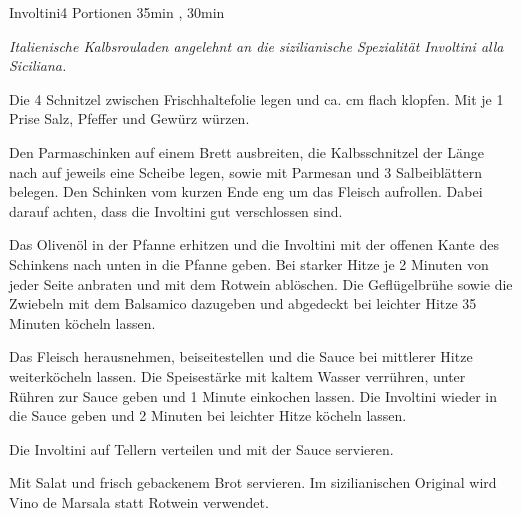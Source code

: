 \documentclass[../recipe-collections/cooking.tex]{subfiles}
\begin{document}
\begin{recipe}{Involtini}{4 Portionen }{35min , 30min }

  \freeform{}\textit{Italienische Kalbsrouladen angelehnt an die sizilianische Spezialität Involtini alla Siciliana.}


  Die 4 Schnitzel zwischen Frischhaltefolie legen und ca.  cm flach klopfen.
  Mit je 1 Prise Salz, Pfeffer und Gewürz würzen.


  Den Parmaschinken auf einem Brett ausbreiten, die Kalbsschnitzel der Länge nach auf jeweils eine Scheibe legen, sowie mit Parmesan und 3 Salbeiblättern belegen.
  Den Schinken vom kurzen Ende eng um das Fleisch aufrollen.
  Dabei darauf achten, dass die Involtini gut verschlossen sind.


  Das Olivenöl in der Pfanne erhitzen und die Involtini mit der offenen Kante des Schinkens nach unten in die Pfanne geben.
  Bei starker Hitze je 2 Minuten von jeder Seite anbraten und mit dem Rotwein ablöschen.
  Die Geflügelbrühe sowie die Zwiebeln mit dem Balsamico dazugeben und abgedeckt bei leichter Hitze 35 Minuten köcheln lassen.


  Das Fleisch herausnehmen, beiseitestellen und die Sauce bei mittlerer Hitze weiterköcheln lassen.
  Die Speisestärke mit kaltem Wasser verrühren, unter Rühren zur Sauce geben und 1 Minute einkochen lassen.
  Die Involtini wieder in die Sauce geben und 2 Minuten bei leichter Hitze köcheln lassen.

  \newstep{}Die Involtini auf Tellern verteilen und mit der Sauce servieren.

  \freeform{}\hrulefill{}

  \freeform{}
  Mit Salat und frisch gebackenem Brot servieren. Im sizilianischen Original wird Vino de Marsala statt Rotwein verwendet.

\end{recipe}
\end{document}

